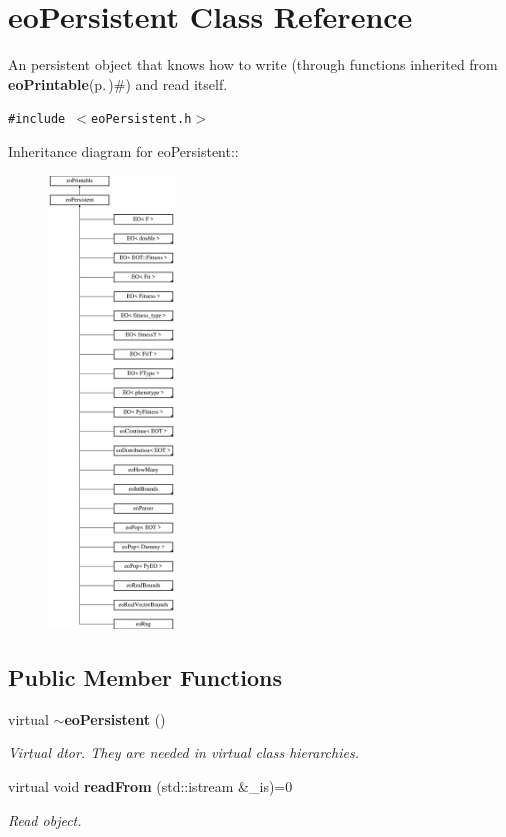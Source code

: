 \section{eo\-Persistent Class Reference}
\label{classeo_persistent}
An persistent object that knows how to write (through functions inherited from {\bf eo\-Printable}{\rm (p.\,\pageref{classeo_printable})}\#) and read itself.  


{\tt \#include $<$eo\-Persistent.h$>$}

Inheritance diagram for eo\-Persistent::\begin{figure}[H]
\begin{center}
\leavevmode
\includegraphics[height=12cm]{classeo_persistent}
\end{center}
\end{figure}
\subsection*{Public Member Functions}
\begin{CompactItemize}
\item 
virtual {\bf $\sim$eo\-Persistent} ()\label{classeo_persistent_a0}

\begin{CompactList}\small\item\em Virtual dtor. They are needed in virtual class hierarchies. \item\end{CompactList}\item 
virtual void {\bf read\-From} (std::istream \&\_\-is)=0
\begin{CompactList}\small\item\em Read object. \item\end{CompactList}\end{CompactItemize}


